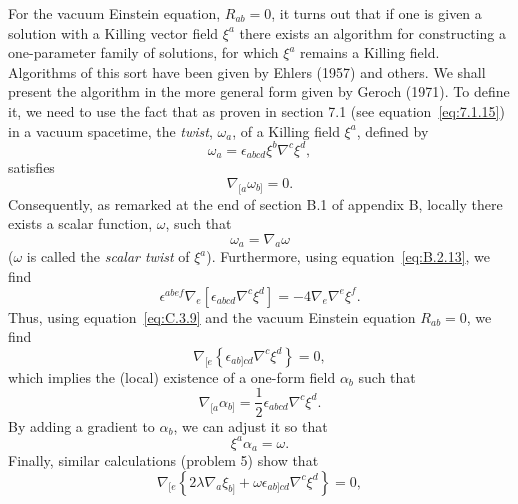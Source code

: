 For the vacuum Einstein equation, \(R_{ab}=0\), it turns out that if one is given a
solution with a Killing vector field \(\xi^a\) there exists an algorithm for
constructing a one-parameter family of solutions, for which \(\xi^a\) remains a
Killing field. Algorithms of this sort have been given by Ehlers (1957) and others.
We shall present the algorithm in the more general form given by Geroch (1971). To
define it, we need to use the fact that as proven in section 7.1 (see
equation~\eqref{eq:7.1.15}) in a vacuum spacetime, the \emph{twist},
\(\omega_a\), of a Killing field \(\xi^a\), defined by
\begin{equation}
  \omega_a=\epsilon_{abcd}\xi^b\nabla^c\xi^d ,
  \tag{7.4.1}\label{eq:7.4.1}
\end{equation}
satisfies
\begin{equation}
  \nabla_{[a}\omega_{b]}=0 .
  \tag{7.4.2}\label{eq:7.4.2}
\end{equation}
Consequently, as remarked at the end of section B.1 of appendix B, locally there
exists a scalar function, \(\omega\), such that
\begin{equation}
  \omega_a=\nabla_a\omega
  \tag{7.4.3}\label{eq:7.4.3}
\end{equation}
(\(\omega\) is called the \emph{scalar twist} of \(\xi^a\)). Furthermore, using
equation~\eqref{eq:B.2.13}, we find
\begin{equation}
  \epsilon^{abef}\nabla_e
    \left[\epsilon_{abcd}\nabla^c\xi^d\right]
    =-4\nabla_e\nabla^e\xi^f .
  \tag{7.4.4}\label{eq:7.4.4}
\end{equation}
Thus, using equation~\eqref{eq:C.3.9} and the vacuum Einstein equation
\(R_{ab}=0\), we find
\begin{equation}
  \nabla_{[e}
    \left\{\epsilon_{ab]cd}\nabla^c\xi^d\right\}=0 ,
  \tag{7.4.5}\label{eq:7.4.5}
\end{equation}
which implies the (local) existence of a one-form field \(\alpha_b\) such that
\begin{equation}
  \nabla_{[a}\alpha_{b]}
    =\frac12\epsilon_{abcd}\nabla^c\xi^d .
  \tag{7.4.6}\label{eq:7.4.6}
\end{equation}
By adding a gradient to \(\alpha_b\), we can adjust it so that
\begin{equation}
  \xi^a\alpha_a=\omega .
  \tag{7.4.7}\label{eq:7.4.7}
\end{equation}
Finally, similar calculations (problem 5) show that
\begin{equation}
  \nabla_{[e}
    \left\{
      2\lambda\nabla_a\xi_{b]}
      +\omega\epsilon_{ab]cd}\nabla^c\xi^d
    \right\}=0 ,
  \tag{7.4.8}\label{eq:7.4.8}
\end{equation}
